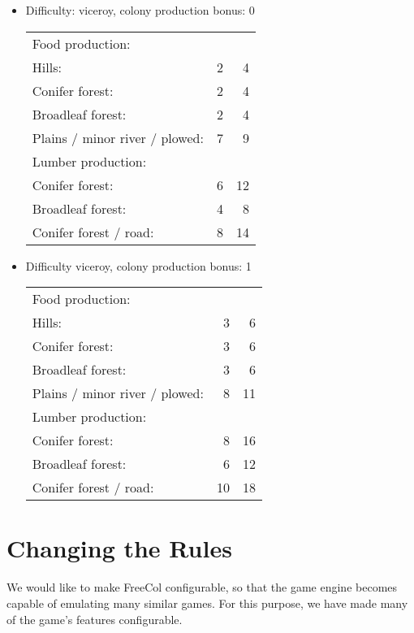 \documentclass[12pt]{book}
\begin{document}
\begin{itemize}

\item Difficulty: viceroy, colony production bonus: 0

\begin{tabular}{lr@{ / }r}
Food production:\\

Hills: & 2 & 4\\
Conifer forest: & 2 & 4\\
Broadleaf forest: & 2 & 4\\
\bigskip
Plains / minor river / plowed: & 7 & 9\\


Lumber production:\\

Conifer forest: & 6 & 12\\
Broadleaf forest: & 4 & 8\\
Conifer forest / road: & 8 & 14\\
\end{tabular}


\item Difficulty viceroy, colony production bonus: 1

\begin{tabular}{lr@{ / }r}
Food production:\\

Hills: & 3 & 6\\
Conifer forest: & 3 & 6\\
Broadleaf forest: & 3 & 6\\
\bigskip
Plains / minor river / plowed: & 8 & 11\\

Lumber production:\\

Conifer forest: & 8 & 16\\
Broadleaf forest: & 6 & 12\\
Conifer forest / road: & 10 & 18\\
\end{tabular}

\end{itemize}



\hypertarget{Changing the Rules}{\chapter{Changing the Rules}}

We would like to make FreeCol configurable, so that the game engine
becomes capable of emulating many similar games. For this purpose,
we have made many of the game's features configurable.
\end{document}
